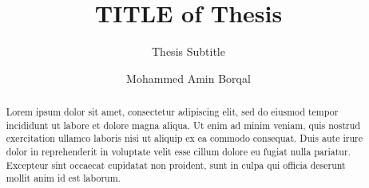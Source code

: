 \documentclass[english,master]{unibg}
\title{TITLE of Thesis}
\subtitle{Thesis Subtitle}
\author{Mohammed Amin Borqal}
\begin{document}
\maketitle
\emptypage

\begin{abstract}
Lorem ipsum dolor sit amet, consectetur adipiscing elit, sed do eiusmod tempor
incididunt ut labore et dolore magna aliqua. Ut enim ad minim veniam, quis
nostrud exercitation ullamco laboris nisi ut aliquip ex ea commodo consequat.
Duis aute irure dolor in reprehenderit in voluptate velit esse cillum dolore eu
fugiat nulla pariatur. Excepteur sint occaecat cupidatat non proident, sunt in
culpa qui officia deserunt mollit anim id est laborum.
\end{abstract}

\emptypage
\toc
\emptypage

\clearpage
{}




\nocite{*}
\printbibliography[heading=bibintoc]
\end{document}
